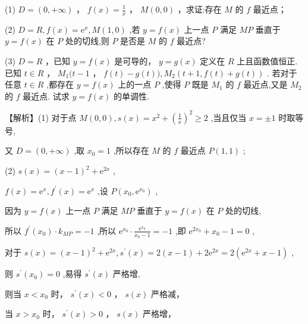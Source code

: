 \documentclass[10pt]{article}
\begin{document}
(1) \(D = \left( {0, + \infty }\right)\) ， \(f\left( x\right)  = \frac{1}{x}\) ， \(M\left( {0,0}\right)\) ，求证:存在 \(M\) 的 \(f\) 最近点；

(2) \(D = R,f\left( x\right)  = {\mathrm{e}}^{x},M\left( {1,0}\right)\) ,若 \(y = f\left( x\right)\) 上一点 \(P\) 满足 \({MP}\) 垂直于 \(y = f\left( x\right)\) 在 \(P\) 处的切线,则 \(P\) 是否是 \(M\) 的 \(f\) 最近点?

(3) \(D = R\) ，已知 \(y = f\left( x\right)\) 是可导的， \(y = g\left( x\right)\) 定义在 \(R\) 上且函数值恒正. 已知 \(t \in  R\) ， \({M}_{1}(t - 1\) ， \(f\left( t\right)  - g\left( t\right) ),{M}_{2}\left( {t + 1,f\left( t\right)  + g\left( t\right) }\right)\) . 若对于任意 \(t \in  R\) ,都存在 \(y = f\left( x\right)\) 上的一点 \(P\) ,使得 \(P\) 既是 \({M}_{1}\) 的 \(f\) 最近点,又是 \({M}_{2}\) 的 \(f\) 最近点. 试求 \(y = f\left( x\right)\) 的单调性.

【解析】(1) 对于点 \(M\left( {0,0}\right) ,s\left( x\right)  = {x}^{2} + {\left( \frac{1}{x}\right) }^{2} \geq  2\) ,当且仅当 \(x =  \pm  1\) 时取等号,

又 \(D = \left( {0, + \infty }\right)\) ,取 \({x}_{0} = 1\) ,所以存在 \(M\) 的 \(f\) 最近点 \(P\left( {1,1}\right)\) ;

(2) \(s\left( x\right)  = {\left( x - 1\right) }^{2} + {\mathrm{e}}^{2x}\) ,

\(f\left( x\right)  = {\mathrm{e}}^{x},{f}^{\prime }\left( x\right)  = {\mathrm{e}}^{x}\) ,设 \(P\left( {{x}_{0},{\mathrm{e}}^{{x}_{0}}}\right)\) ,

因为 \(y = f\left( x\right)\) 上一点 \(P\) 满足 \({MP}\) 垂直于 \(y = f\left( x\right)\) 在 \(P\) 处的切线,

所以 \({f}^{\prime }\left( {x}_{0}\right)  \cdot  {k}_{MP} =  - 1\) ,所以 \({\mathrm{e}}^{{x}_{0}} \cdot  \frac{{\mathrm{e}}^{{x}_{0}}}{{x}_{0} - 1} =  - 1\) ,即 \({\mathrm{e}}^{2{x}_{0}} + {x}_{0} - 1 = 0\) ,

对于 \(s\left( x\right)  = {\left( x - 1\right) }^{2} + {\mathrm{e}}^{2x},{s}^{\prime }\left( x\right)  = 2\left( {x - 1}\right)  + 2{\mathrm{e}}^{2x} = 2\left( {{\mathrm{e}}^{2x} + x - 1}\right)\) ,

则 \({s}^{\prime }\left( {x}_{0}\right)  = 0\) ,易得 \({s}^{\prime }\left( x\right)\) 严格增,

则当 \(x < {x}_{0}\) 时， \({s}^{\prime }\left( x\right)  < 0\) ， \(s\left( x\right)\) 严格减，

当 \(x > {x}_{0}\) 时， \({s}^{\prime }\left( x\right)  > 0\) ， \(s\left( x\right)\) 严格增，
\end{document}
